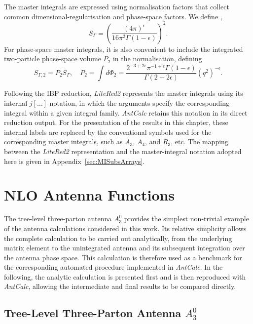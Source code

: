 The master integrals are expressed using normalisation factors that collect common
dimensional-regularisation and phase-space factors. We define
\cite{Gehrmann-DeRidder:2004ttg,GehrmannDeRidder0311276},
\begin{equation}
    S_\Gamma = \left(\frac{(4\pi)^\epsilon}{16\pi^2\Gamma(1-\epsilon)}\right)^2.\label{eq:SGamma}
\end{equation}
For phase-space master integrals, it is also convenient to include the integrated two-particle
phase-space volume $P_2$ in the normalisation, defining
\begin{equation}
    S_{\Gamma,2} = P_2 S_\Gamma,\quad P_2 = \int d\Phi_2 = \frac{2^{-3+2\epsilon}\pi^{-1+\epsilon}\Gamma(1-\epsilon)}{\Gamma(2-2\epsilon)}\!\left(q^2\right)^{-\epsilon}.
\end{equation}

Following the IBP reduction, \textit{LiteRed2} represents the master integrals using its internal
$j[\ldots]$ notation, in which the arguments specify the corresponding integral within a given
integral family. \textit{AntCalc} retains this notation in its direct reduction output. For the
presentation of the results in this chapter, these internal labels are replaced by the conventional
symbols used for the corresponding master integrals, such as $A_3$, $A_4$, and $R_3$, etc. The
mapping between the \textit{LiteRed2} representation and the master-integral notation adopted here
is given in Appendix~\ref{sec:MISubsArrays}.

\section{NLO Antenna Functions}

The tree-level three-parton antenna $A_3^0$ provides the simplest non-trivial example of the antenna
calculations considered in this work. Its relative simplicity allows the complete calculation to be
carried out analytically, from the underlying matrix element to the unintegrated antenna and its
subsequent integration over the antenna phase space. This calculation is therefore used as a benchmark
for the corresponding automated procedure implemented in \textit{AntCalc}. In the following, the
analytic calculation is presented first and is then reproduced with \textit{AntCalc}, allowing the
intermediate and final results to be compared directly. 

\subsection{Tree-Level Three-Parton Antenna $A_3^0$}\label{sec:matDerivation}

